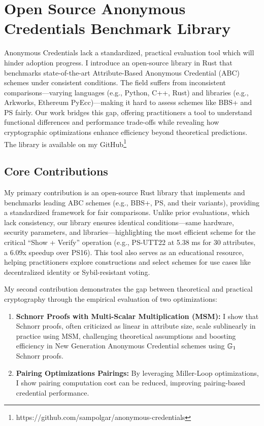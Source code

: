 \chapter{Open Source Anonymous Credentials Benchmark Library}\label{chap6}
Anonymous Credentials lack a standardized, practical evaluation tool which will hinder adoption progress. I introduce an open-source library in Rust that benchmarks state-of-the-art Attribute-Based Anonymous Credential (ABC) schemes under consistent conditions. The field suffers from inconsistent comparisons—varying languages (e.g., Python, C++, Rust) and libraries (e.g., Arkworks, Ethereum PyEcc)—making it hard to assess schemes like BBS+ and PS fairly. Our work bridges this gap, offering practitioners a tool to understand functional differences and performance trade-offs while revealing how cryptographic optimizations enhance efficiency beyond theoretical predictions. The library is available on my GitHub\footnote{https://github.com/sampolgar/anonymous-credentials}

\section{Core Contributions}
My primary contribution is an open-source Rust library that implements and benchmarks leading ABC schemes (e.g., BBS+, PS, and their variants), providing a standardized framework for fair comparisons. Unlike prior evaluations, which lack consistency, our library ensures identical conditions—same hardware, security parameters, and libraries—highlighting the most efficient scheme for the critical ``Show + Verify'' operation (e.g., PS-UTT22 at 5.38 ms for 30 attributes, a 6.09x speedup over PS16). This tool also serves as an educational resource, helping practitioners explore constructions and select schemes for use cases like decentralized identity or Sybil-resistant voting.

My second contribution demonstrates the gap between theoretical and practical cryptography through the empirical evaluation of two optimizations:
\begin{enumerate}
    \item \textbf{Schnorr Proofs with Multi-Scalar Multiplication (MSM):} I show that Schnorr proofs, often criticized as linear in attribute size, scale sublinearly in practice using MSM, challenging theoretical assumptions and boosting efficiency in New Generation Anonymous Credential schemes using $\mathbb{G}_1$ Schnorr proofs.
    
    \item \textbf{Pairing Optimizations Pairings:} By leveraging Miller-Loop optimizations, I show pairing computation cost can be reduced,  improving pairing-based credential performance.
\end{enumerate}


